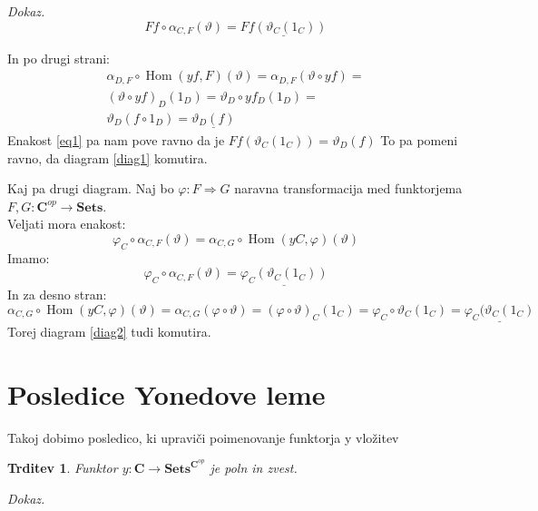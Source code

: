 \documentclass[12pt,a4paper]{book}
\theoremstyle{definition}
\theoremstyle{plain}
\newtheorem{trditev}[definicija]{Trditev}
\newenvironment{dokaz}{\emph{Dokaz.}\ }{\hspace{\fill}{$\Box$}}
\theoremstyle{definition}
\theoremstyle{remark}
\newcommand{\cat}[1]{\textbf{#1}}
\DeclareMathOperator{\Hom}{Hom}
\begin{document}
\begin{dokaz}
$$Ff \circ \alpha_{C,F}(\vartheta) = \underline{Ff(\vartheta_C(1_C))}$$

In po drugi strani:
\begin{align*}
\alpha_{D,F} \circ \Hom(yf,F)(\vartheta) = \alpha_{D,F}(\vartheta \circ yf) = \\
(\vartheta \circ yf)_D (1_D) = \vartheta_D \circ yf_D(1_D) = \\
\vartheta_D(f \circ 1_D) = \underline{\vartheta_D(f)}
\end{align*}
Enakost \ref{eq1} pa nam pove ravno da je $Ff(\vartheta_C(1_C)) = \vartheta_D(f)$
To pa pomeni ravno, da diagram \ref{diag1} komutira.

Kaj pa drugi diagram. Naj bo $\varphi : F \Rightarrow G$ naravna transformacija med funktorjema $F,G : \cat{C}^{op} \to \cat{Sets}$. \\
Veljati mora enakost:
$$\varphi_C \circ \alpha_{C,F}(\vartheta) = \alpha_{C,G} \circ \Hom(yC,\varphi)(\vartheta)$$
Imamo:
$$\varphi_C \circ \alpha_{C,F}(\vartheta) = \underline{\varphi_C(\vartheta_C(1_C))}$$
In za desno stran:
$$\alpha_{C,G} \circ \Hom(yC,\varphi)(\vartheta) = \alpha_{C,G}(\varphi \circ \vartheta) = 
(\varphi \circ \vartheta)_C(1_C) = \varphi_C \circ \vartheta_C(1_C) = \underline{\varphi_C(\vartheta_C(1_C)}$$
Torej diagram \ref{diag2} tudi komutira.

\end{dokaz}

\section{Posledice Yonedove leme}

Takoj dobimo posledico, ki upraviči poimenovanje funktorja y vložitev
\begin{trditev} Funktor $y : \cat{C} \to \cat{Sets}^{\cat{C}^{op}}$ je poln in zvest.
\end{trditev}
\begin{dokaz}

\end{dokaz}
\end{document}
